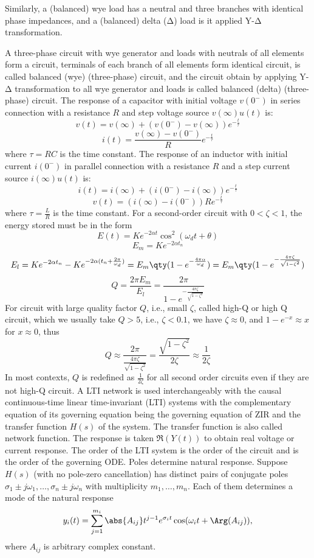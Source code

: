 \documentclass[a4paper,12pt]{article}
\begin{document}
Similarly, a (balanced) wye load has a neutral and three branches with identical phase impedances, and a (balanced) delta (Δ) load is it applied Y-Δ transformation.

A three-phase circuit with wye generator and loads with neutrals of all elements form a circuit, terminals of each branch of all elements form identical circuit, is called balanced (wye) (three-phase) circuit, and the circuit obtain by applying Y-Δ transformation to all wye generator and loads is called balanced (delta) (three-phase) circuit.
The response of a capacitor with initial voltage $v(0^-)$ in series connection with a resistance $R$ and step voltage source $v(\infty)u(t)$ is:
\[v(t)=v(\infty)+(v(0^-)-v(\infty))e^{-\frac{t}{\tau}}\]
\[i(t)=\frac{v(\infty)-v(0^-)}{R}e^{-\frac{t}{\tau}}\]
where $\tau=RC$ is the time constant.
The response of an inductor with initial current $i(0^-)$ in parallel connection with a resistance $R$ and a step current source $i(\infty)u(t)$ is:
\[i(t)=i(\infty)+(i(0^-)-i(\infty))e^{-\frac{t}{\tau}}\]
\[v(t)=(i(\infty)-i(0^-))Re^{-\frac{t}{\tau}}\]
where $\tau=\frac{L}{R}$ is the time constant.
For a second-order circuit with $0<\zeta<1$, the energy stored must be in the form
\[E(t)=Ke^{-2\alpha t}\cos^2(\omega_dt+\theta)\]
\[E_m=Ke^{-2\alpha t_n}\]
\[E_l=Ke^{-2\alpha t_n}-Ke^{-2\alpha (t_n+\frac{2\pi}{\omega_d})}=E_m\qty(1-e^{-\frac{4\pi\alpha}{\omega_d}})=E_m\qty(1-e^{-\frac{4\pi\zeta}{\sqrt{1-\zeta^2}}})\]
\[Q=\frac{2\pi E_m}{E_l}=\frac{2\pi}{1-e^{-\frac{4\pi\zeta}{\sqrt{1-\zeta^2}}}}\]
For circuit with large quality factor $Q$, i.e., small $\zeta$, called high-Q or high Q circuit, which we usually take $Q>5$, i.e., $\zeta<0.1$, we have $\zeta\approx0$, and $1-e^{-x}\approx x$ for $x\approx 0$, thus
\[Q\approx\frac{2\pi}{\frac{4\pi\zeta}{\sqrt{1-\zeta^2}}}=\frac{\sqrt{1-\zeta^2}}{2\zeta}\approx\frac{1}{2\zeta}\]
In most contexts, $Q$ is redefined as $\frac{1}{2\zeta}$ for all second order circuits even if they are not high-Q circuit.
A LTI network is used interchangeably with the causal continuous-time linear time-invariant (LTI) systems with the complementary equation of its governing equation being the governing equation of ZIR and the transfer function $H(s)$ of the system. The transfer function is also called network function. The response is taken $\Re(Y(t))$ to obtain real voltage or current response. The order of the LTI system is the order of the circuit and is the order of the governing ODE.
Poles determine natural response. Suppose $H(s)$ (with no pole-zero cancellation) has distinct pairs of conjugate poles $\sigma_1\pm j\omega_1,\ldots,\sigma_n\pm j\omega_n$ with multiplicity $m_1,\ldots,m_n$. Each of them determines a mode of the natural response
\[y_i(t)=\sum_{j=1}^{m_i}\abs{A_{ij}}t^{j-1}e^{\sigma_it}\cos(\omega_it+\Arg(A_{ij})),\]
where $A_{ij}$ is arbitrary complex constant.
\end{document}
